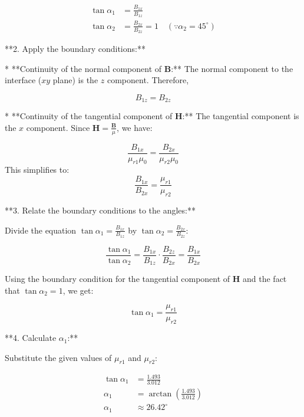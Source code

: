 \documentclass{article}
\begin{document}
\begin{align*}
\tan \alpha_1 &= \frac{B_{1x}}{B_{1z}} \\
\tan \alpha_2 &= \frac{B_{2x}}{B_{2z}} = 1  \quad (\because \alpha_2 = 45^\circ)
\end{align*}

**2. Apply the boundary conditions:**

* **Continuity of the normal component of $\mathbf{B}$:**
   The normal component to the interface ($xy$ plane) is the $z$ component.  Therefore,
   
   \begin{equation*}
   B_{1z} = B_{2z} 
   \end{equation*}

* **Continuity of the tangential component of $\mathbf{H}$:**
   The tangential component is the $x$ component. Since $\mathbf{H} = \frac{\mathbf{B}}{\mu}$, we have:

   \begin{equation*}
   \frac{B_{1x}}{\mu_{r1} \mu_0} = \frac{B_{2x}}{\mu_{r2} \mu_0} 
   \end{equation*}
   This simplifies to:
   \begin{equation*}
   \frac{B_{1x}}{B_{2x}} = \frac{\mu_{r1}}{\mu_{r2}}
   \end{equation*}

**3. Relate the boundary conditions to the angles:**

Divide the equation $\tan \alpha_1 = \frac{B_{1x}}{B_{1z}}$ by $\tan \alpha_2 = \frac{B_{2x}}{B_{2z}}$:

\begin{equation*}
\frac{\tan \alpha_1}{\tan \alpha_2} = \frac{B_{1x}}{B_{1z}} \cdot \frac{B_{2z}}{B_{2x}} = \frac{B_{1x}}{B_{2x}}
\end{equation*}

Using the boundary condition for the tangential component of $\mathbf{H}$ and the fact that $\tan \alpha_2 = 1$, we get:

\begin{equation*}
\tan \alpha_1 = \frac{\mu_{r1}}{\mu_{r2}} 
\end{equation*}

**4. Calculate $\alpha_1$:**

Substitute the given values of $\mu_{r1}$ and $\mu_{r2}$:

\begin{align*}
\tan \alpha_1 &= \frac{1.493}{3.012} \\
\alpha_1 &= \arctan \left( \frac{1.493}{3.012} \right) \\
\alpha_1 &\approx 26.42^\circ
\end{align*}
\end{document}
